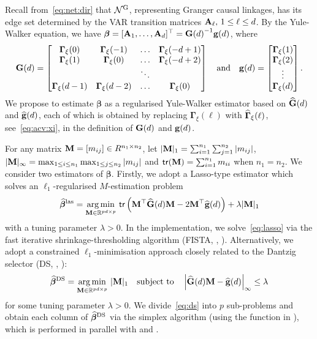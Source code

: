 Recall from~\eqref{eq:net:dir} that $\mathcal N^{\text{\upshape{G}}}$, representing Granger causal linkages, has its edge set determined by the VAR transition matrices $\mathbf A_\ell, \, 1 \le \ell \le d$. 
By the Yule-Walker equation, we have $\bm\beta = [ \mathbf A_1, \dots, \mathbf A_{d} ]^\top = {\mathbf G(d)}^{-1} \mathbf g(d)$, where
\begin{align}
\label{eq:gg}
\mathbf G(d) = \begin{bmatrix} 
\bm\Gamma_\xi(0) & \bm\Gamma_\xi(-1) & \ldots & \bm\Gamma_\xi(-d + 1) 
\\
\bm\Gamma_\xi(1) & \bm\Gamma_\xi(0) & \ldots & \bm\Gamma_\xi(-d + 2)
\\
& & \ddots & 
\\
\bm\Gamma_\xi(d - 1) & \bm\Gamma_\xi(d - 2) & \ldots & \bm\Gamma_\xi(0)
\end{bmatrix} 
\quad \text{and} \quad
\mathbf g(d) = \begin{bmatrix}
\bm\Gamma_\xi(1)
\\
\bm\Gamma_\xi(2)
\\
\vdots
\\
\bm\Gamma_\xi(d)
\end{bmatrix}.
\end{align}
We propose to estimate $\bm\beta$ as a regularised Yule-Walker estimator based on $\widehat{\mathbf G}(d)$ and $\widehat{\mathbf g}(d)$, each of which is obtained by replacing $\bm\Gamma_\xi(\ell)$ with $\widehat{\bm\Gamma}_\xi(\ell)$, see~\eqref{eq:acv:xi}, in the definition of $\mathbf G(d)$ and $\mathbf g(d)$.

For any matrix $\mathbf M = [m_{ij}] \in R^{n_1 \times n_2}$, let $\vert \mathbf M \vert_1 = \sum_{i = 1}^{n_1} \sum_{j = 1}^{n_2} \vert m_{ij} \vert$, $\vert \mathbf M \vert_\infty = \max_{1 \le i \le n_1} \max_{1 \le j \le n_2} \vert m_{ij} \vert$ and $\mathsf{tr}(\mathbf M) = \sum_{i = 1}^{n_1} m_{ii}$ when $n_1 = n_2$.
We consider two estimators of $\bm\beta$.
Firstly, we adopt a Lasso-type estimator which solves an $\ell_1$-regularised $M$-estimation problem
\begin{align}
\label{eq:lasso}
\widehat{\bm\beta}^{\text{\upshape{las}}} = \underset{\mathbf M \in \mathbb{R}^{pd \times p}}{\arg\min} \
\mathsf{tr}\left( \mathbf M^\top \widehat{\mathbf G}(d) \mathbf M - 2\mathbf M^\top\widehat{\mathbf g}(d) \right)
+ \lambda \vert \mathbf M \vert_1
\end{align}
with a tuning parameter $\lambda > 0$.
In the implementation, we solve~\eqref{eq:lasso} via the fast iterative shrinkage-thresholding algorithm (FISTA, \citeauthor{beck2009fast}, \citeyear{beck2009fast}).
Alternatively, we adopt a constrained $\ell_1$-minimisation approach closely related to the Dantzig selector (DS, \citeauthor{candes2007dantzig}, \citeyear{candes2007dantzig}):
\begin{align}
\label{eq:ds}
\widehat{\bm\beta}^{\text{\upshape{DS}}} =  \underset{\mathbf M \in \mathbb{R}^{pd \times p}}{\arg\min} \ \vert \mathbf M \vert_1
\quad \text{subject to} \quad
\left\vert \widehat{\mathbf G}(d) \mathbf M - \widehat{\mathbf g}(d) \right\vert_\infty \le \lambda
\end{align}
for some tuning parameter $\lambda > 0$.
We divide~\eqref{eq:ds} into $p$ sub-problems and obtain each column of $\widehat{\bm\beta}^{\text{\upshape{DS}}}$ via the simplex algorithm (using the function  in  \citep{lpsolve}), which is performed in parallel  with  and  \citep{doparallel, foreach}.

